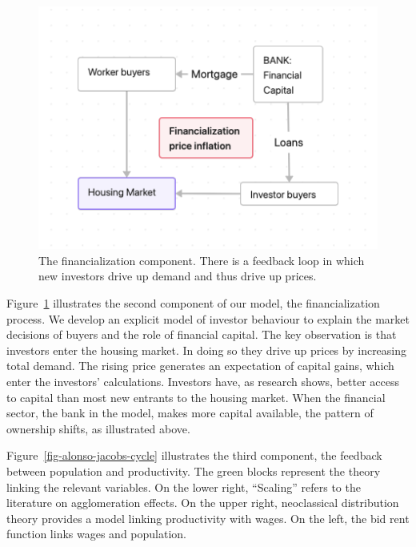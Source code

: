 \begin{figure}[!ht]
\centering
\includegraphics[scale=.70]{fig/flow-financialization.png}
\caption[The financialization component of the model.]{The financialization component. There is a feedback loop in which new investors drive up demand and thus drive up prices.}
\label{fig-financial-cycle}
\end{figure}

Figure~\ref{fig-financial-cycle} illustrates the second component of our model, the financialization process. We develop an explicit model of investor behaviour to explain the market decisions of buyers and the role of financial capital. The key observation is that investors enter the housing market. In doing so they drive up prices by increasing total demand. The rising price generates an expectation of capital gains, which enter the investors' calculations. Investors have, as research shows, better access to capital than most new entrants to the housing market. When the financial sector, the bank in the model, makes more capital available, the pattern of ownership shifts, as illustrated above.

Figure~\ref{fig-alonso-jacobs-cycle} illustrates the third component, the feedback between population and productivity. The green blocks represent the theory linking the relevant variables.  On the lower right, ``Scaling'' refers to the literature on agglomeration effects. On the upper right, neoclassical distribution theory provides a model linking productivity with wages.  On the left, the bid rent function links wages and population.


